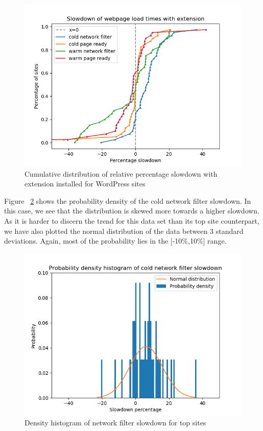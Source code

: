 \begin{figure}[h]
	\includegraphics[scale=0.5]{results/extension_slowdown_wordpress}
	\caption{Cumulative distribution of relative percentage slowdown with extension installed for WordPress sites}
	\label{fig:wordpress_slowdown}
\end{figure}

Figure ~\ref{fig:histogram_slowdown_wordpress} shows the probability density of the cold network filter slowdown. In this case, we see that the distribution is skewed more towards a higher slowdown. As it is harder to discern the trend for this data set than its top site counterpart, we have also plotted the normal distribution of the data between 3 standard deviations. Again, most of the probability lies in the [-10\%,10\%] range.

\begin{figure}[h]
	\includegraphics[scale=0.5]{results/density_histogram_filter_slowdown_wordpress}
	\caption{Density histogram of network filter slowdown for top sites}
	\label{fig:histogram_slowdown_wordpress}
\end{figure}

